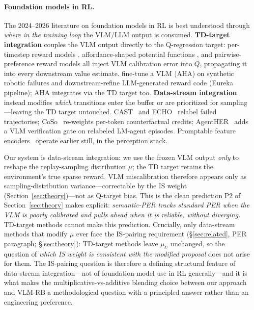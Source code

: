 \documentclass{article}
\begin{document}
\paragraph{Foundation models in RL.}
The 2024--2026 literature on foundation models in RL is best understood through
\emph{where in the training loop} the VLM/LLM output is consumed.
\textbf{TD-target integration} couples the VLM output directly to the Q-regression
target: per-timestep reward models \citep{wu2026largerewardmodels,patel2025iker},
affordance-shaped potential functions \citep{lee2025kagi}, and pairwise-preference
reward models \citep{rocamonde2024vlmreward,venuto2024car,wang2024rlvlmf}
all inject VLM calibration error into $Q$, propagating it into every downstream
value estimate. \citet{duan2025aha} fine-tune a VLM (AHA) on synthetic robotic
failures and downstream-refine LLM-generated reward code (Eureka pipeline);
AHA integrates via the TD target too.
\textbf{Data-stream integration} instead modifies \emph{which} transitions enter
the buffer or are prioritized for sampling---leaving the TD target untouched.
CAST~\citep{glossop2025cast} and ECHO~\citep{hu2026echo} relabel failed
trajectories; CoSo~\citep{feng2025coso} re-weights per-token counterfactual
credits; AgentHER~\citep{ding2026agentHER} adds a VLM verification gate on
relabeled LM-agent episodes.
Promptable feature encoders~\citep{chen2024promptable} operate earlier still,
in the perception stack.

Our system is data-stream integration: we use the frozen VLM output
\emph{only} to reshape the replay-sampling distribution $\mu$; the TD target
retains the environment's true sparse reward. VLM miscalibration therefore
appears only as sampling-distribution variance---correctable by the IS weight
(Section~\ref{sec:theory})---not as Q-target bias. This is the clean
prediction P2 of Section~\ref{sec:theory} makes explicit:
\emph{semantic-PER tracks standard PER when the VLM is poorly calibrated
and pulls ahead when it is reliable, without diverging.}
TD-target methods cannot make this prediction.
Crucially, only data-stream methods that modify $\mu$ ever face the
IS-pairing requirement (\S\ref{sec:related}, PER paragraph; \S\ref{sec:theory}):
TD-target methods leave $\mu_U$ unchanged, so the question of
\emph{which IS weight is consistent with the modified proposal} does not
arise for them. The IS-pairing question is therefore a defining structural
feature of data-stream integration---not of foundation-model use in RL
generally---and it is what makes the multiplicative-vs-additive blending
choice between our approach and VLM-RB a methodological question with a
principled answer rather than an engineering preference.
\end{document}
